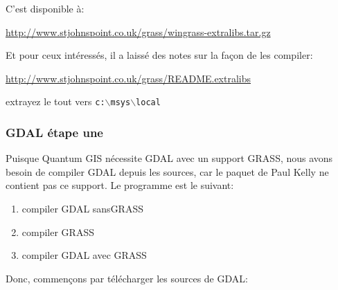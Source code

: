 C'est disponible à:

\url{http://www.stjohnspoint.co.uk/grass/wingrass-extralibs.tar.gz}

Et pour ceux intéressés, il a laissé des notes sur la façon de les compiler:

\url{http://www.stjohnspoint.co.uk/grass/README.extralibs}

extrayez le tout vers \texttt{c:$\backslash$msys$\backslash$local}

% 
% 
% 
% 
% 

\subsubsection{GDAL étape une}
Puisque Quantum GIS nécessite GDAL avec un support GRASS, nous avons besoin de compiler GDAL depuis les sources, car le paquet de Paul Kelly ne contient pas ce support.
Le programme est le suivant:

\begin{enumerate}
\item compiler GDAL sansGRASS
\item compiler GRASS
\item compiler GDAL avec GRASS
\end{enumerate}

Donc, commençons par télécharger les sources de GDAL:


